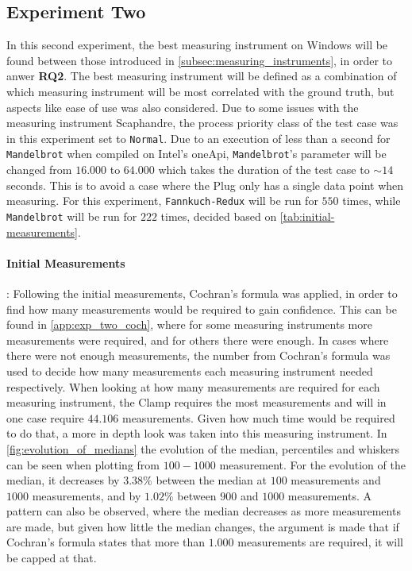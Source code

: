 \subsection{Experiment Two}\label{subsec:exp_two}

In this second experiment, the best measuring instrument on Windows will be found between those introduced in \cref{subsec:measuring_instruments}, in order to anwer \textbf{RQ2}. The best measuring instrument will be defined as a combination of which measuring instrument will be most correlated with the ground truth, but aspects like ease of use was also considered. Due to some issues with the measuring instrument Scaphandre, the process priority class of the test case was in this experiment set to \texttt{Normal}. Due to an execution of less than a second for \texttt{Mandelbrot} when compiled on Intel's oneApi, \texttt{Mandelbrot}'s parameter will be changed from $16.000$ to $64.000$ which takes the duration of the test case to $\sim 14$ seconds. This is to avoid a case where the Plug only has a single data point when measuring. For this experiment, \texttt{Fannkuch-Redux} will be run for $550$ times, while \texttt{Mandelbrot} will be run for $222$ times, decided based on \cref{tab:initial-measurements}.

\paragraph{Initial Measurements}: Following the initial measurements, Cochran's formula was applied, in order to find how many measurements would be required to gain confidence. This can be found in \cref{app:exp_two_coch}, where for some measuring instruments more measurements were required, and for others there were enough. In cases where there were not enough measurements, the number from Cochran's formula was used to decide how many measurements each measuring instrument needed respectively. When looking at how many measurements are required for each measuring instrument, the Clamp requires the most measurements and will in one case require $44.106$ measurements. Given how much time would be required to do that, a more in depth look was taken into this measuring instrument. In \cref{fig:evolution_of_medians} the evolution of the median, percentiles and whiskers can be seen when plotting from $100-1000$ measurement. For the evolution of the median, it decreases by $3.38\%$ between the median at $100$ measurements and $1000$ measurements, and by $1.02\%$ between $900$ and $1000$ measurements. A pattern can also be observed, where the median decreases as more measurements are made, but given how little the median changes, the argument is made that if Cochran's formula states that more than $1.000$ measurements are required, it will be capped at that.

